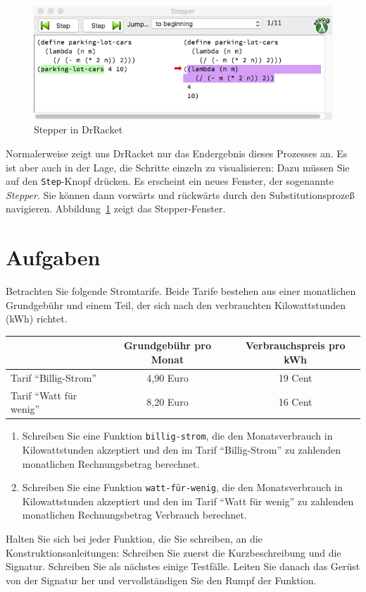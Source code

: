 \begin{figure}[tb]
  \centering
  \includegraphics[width=\textwidth]{i1prog/stepper.png}
  \caption{Stepper in DrRacket}
  \label{fig:stepper}
\end{figure}
%
Normalerweise zeigt uns DrRacket nur das Endergebnis dieses Prozesses
an.  Es ist aber auch in der Lage, die Schritte einzeln zu
visualisieren: Dazu müssen Sie auf den \texttt{Step}-Knopf drücken.
Es erscheint ein neues Fenster, der sogenannte \textit{Stepper}.
Sie können dann vorwärts und rückwärts durch den Substitutionsprozeß
navigieren.  Abbildung~\ref{fig:stepper} zeigt das Stepper-Fenster.

\section*{Aufgaben}


\begin{aufgabe}
  Betrachten Sie folgende Stromtarife.  Beide Tarife
  bestehen aus einer monatlichen Grundgebühr und einem Teil, der sich
  nach den verbrauchten Kilowattstunden (kWh) richtet.
  \begin{center}
    \begin{tabular}{l|c|c|}
      & Grundgebühr pro Monat & Verbrauchspreis pro kWh \\
      \hline
      Tarif "`Billig-Strom"' & 4,90 Euro & 19 Cent \\
      \hline
      Tarif "`Watt für wenig"' & 8,20 Euro & 16 Cent \\
      \hline
    \end{tabular}
  \end{center}

  \begin{enumerate}
  \item Schreiben Sie eine Funktion
    \texttt{billig-strom}, die den Monatsverbrauch in Kilowattstunden
    akzeptiert und den im Tarif "`Billig-Strom"' zu zahlenden
    monatlichen Rechnungsbetrag 
    berechnet.

  \item Schreiben Sie eine Funktion
    \texttt{watt-für-wenig}, die den Monatsverbrauch in
    Kilowattstunden akzeptiert und den im Tarif "`Watt für wenig"' zu
    zahlenden monatlichen Rechnungsbetrag
    Verbrauch berechnet.
  \end{enumerate}
  Halten Sie sich bei jeder Funktion, die Sie schreiben, an die
  Konstruktionsanleitungen: Schreiben Sie zuerst die Kurzbeschreibung
  und die Signatur.  Schreiben Sie als nächstes einige Testfälle.
  Leiten Sie danach das Gerüst von der Signatur her und vervollständigen
  Sie den Rumpf der Funktion.
\end{aufgabe}

